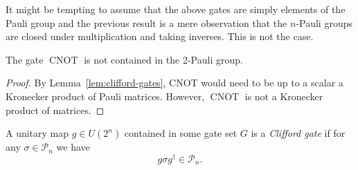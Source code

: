 \documentclass[a4paper, oneside, 12pt]{amsart}
\DeclareMathOperator{\CNOT}{CNOT}
\newcommand*{\PauliGroup}{\ensuremath{\mathcal{P}}}
\begin{document}
It might be tempting to assume that the above gates are simply elements of the Pauli group and the previous result is a mere observation that the \(n\)-Pauli groups are closed under multiplication and taking inverses.
This is not the case.

\begin{lemma}\label{lem:CNOT-is-not-in-Pauli-group}
  The gate \(\CNOT\) is not contained in the 2-Pauli group.
\end{lemma}

\begin{proof}
  By Lemma~\ref{lem:clifford-gates}, CNOT would need to be up to a scalar a Kronecker product of Pauli matrices.
  However, \(\CNOT\) is not a Kronecker product of matrices.
\end{proof}

\begin{definition}\label{def:Clifford-gates}
  A unitary map \(g \in U(2^{n})\) contained in some gate set \(G\) is a \emph{Clifford gate} if for any \(\sigma \in \PauliGroup_{n}\) we have
  \begin{equation*}
    g\sigma g^{\dagger} \in \PauliGroup_{n}.
  \end{equation*}
\end{definition}
\end{document}
